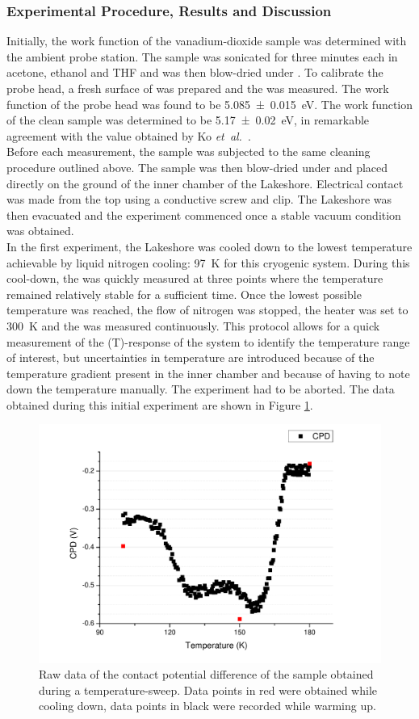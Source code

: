 \subsubsection{Experimental Procedure, Results and Discussion}
Initially, the work function of the vanadium-dioxide sample was determined with the ambient probe station. The sample was sonicated for three minutes each in acetone, ethanol and THF and was then blow-dried under \nitro{}. To calibrate the probe head, a fresh surface of \hopg{} was prepared and the \cpd{} was measured. The work function of the probe head was found to be \SI{5.085+-0.015}{\electronvolt}. The work function of the clean \wvadiox{} sample was determined to be \SI{5.17+-0.02}{\electronvolt}, in remarkable agreement with the value obtained by Ko \emph{et~al.}~\cite{ko_kp}.\\
Before each measurement, the sample was subjected to the same cleaning procedure outlined above. The sample was then blow-dried under \nitro{} and placed directly on the ground of the inner chamber of the Lakeshore. Electrical contact was made from the top using a conductive screw and clip. The Lakeshore was then evacuated and the experiment commenced once a stable vacuum condition was obtained.\\
In the first experiment, the Lakeshore was cooled down to the lowest temperature achievable by liquid nitrogen cooling: \SI{97}{\kelvin} for this cryogenic system. During this cool-down, the \cpd{} was quickly measured at three points where the temperature remained relatively stable for a sufficient time. Once the lowest possible temperature was reached, the flow of nitrogen was stopped, the heater was set to \SI{300}{\kelvin} and the \cpd{} was measured continuously. This protocol allows for a quick measurement of the \cpd{}(T)-response of the system to identify the temperature range of interest, but uncertainties in temperature are introduced because of the temperature gradient present in the inner chamber and because of having to note down the temperature manually. The experiment had to be aborted. The data obtained during this initial experiment are shown in Figure \ref{fig:vox1}.\\
\begin{figure}
\centering
	\includegraphics[width=0.8\linewidth]{./figs/chap2/vox1}
	\caption{Raw data of the contact potential difference of the \wvadiox{} sample obtained during a temperature-sweep. Data points in red were obtained while cooling down, data points in black were recorded while warming up.}
	\label{fig:vox1}
\end{figure}
